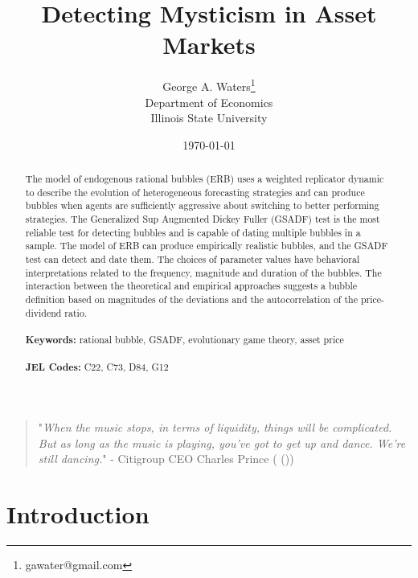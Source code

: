\documentclass[12pt]{article}
\begin{document}
\begin{titlepage}
\title{Detecting Mysticism in Asset Markets}
\author{George A. Waters\thanks{gawater@gmail.com}\\
Department of Economics\\
Illinois State University}

\date{\today}
\maketitle
\begin{abstract}
The model of endogenous rational bubbles (ERB) uses a weighted replicator dynamic to describe the evolution of heterogeneous forecasting strategies and can produce bubbles when agents are sufficiently aggressive about switching to better performing strategies. The Generalized Sup Augmented Dickey Fuller (GSADF) test is the most reliable test for detecting bubbles and is capable of dating multiple bubbles in a sample. The model of ERB can produce empirically realistic bubbles, and the GSADF test can detect and date them. The choices of parameter values have behavioral interpretations related to the frequency, magnitude and duration of the bubbles. The interaction between the theoretical and empirical approaches suggests a bubble definition based on magnitudes of the deviations and the autocorrelation of the price-dividend ratio.
\noindent\\
\vspace{0in}\\
\noindent\textbf{Keywords:} rational bubble, GSADF, evolutionary game theory, asset price\\
\vspace{0in}\\
\noindent\textbf{JEL Codes:} C22, C73, D84, G12\\

\bigskip
\end{abstract}
\setcounter{page}{0}
\thispagestyle{empty}
\end{titlepage}
\pagebreak \newpage
\begin{quote}
    "\textit{When the music stops, in terms of liquidity, things will be complicated. But as long as the music is playing, you've got to get up and dance. We're still dancing.}"
    - Citigroup CEO Charles Prince (\citeauthor{princequote2007citigroup} (\citeyear{princequote2007citigroup}))
\end{quote}

\section{Introduction}
\end{document}

